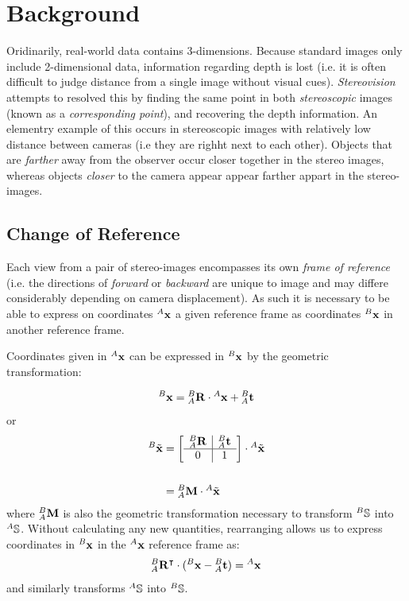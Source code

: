\chapter{Background}

\par Oridinarily, real-world data contains 3-dimensions. 
Because standard images only include 2-dimensional data, information regarding depth is lost (i.e. it is often difficult to judge distance from a single image without visual cues). 
\textit{Stereovision} attempts to resolved this by finding the same point in both \textit{stereoscopic} images (known as a \textit{corresponding point}), and recovering the depth information.
An elementry example of this occurs in stereoscopic images with relatively low distance between cameras (i.e they are righht next to each other). 
Objects that are \textit{farther} away from the observer occur closer together in the stereo images, whereas objects \textit{closer} to the camera appear appear farther appart in the stereo-images.

\section{Change of Reference}

\par Each view from a pair of stereo-images encompasses its own \textit{frame of reference} (i.e. the directions of \textit{forward} or \textit{backward} are unique to image and may differe considerably depending on camera displacement).
As such it is necessary to be able to express on coordinates ${^{A}\mathbf{x}}$ a given reference frame as coordinates ${^{B}\mathbf{x}}$ in another reference frame.

\par Coordinates given in ${^{A}\mathbf{x}}$ can be expressed in ${^{B}\mathbf{x}}$ by the geometric transformation:
\par
\begin{align*}
	{\ensuremath{^{B}}\mathbf{x}} = {^{B}_{A}}\mathbf{R} \cdot {\ensuremath{^{A}}\mathbf{x}} + {^{B}_{A}}\mathbf{t}
\end{align*}
or
\begin{align*}
	{\ensuremath{^{B}}\tilde{\mathbf{x}}} &=
	\left[\begin{array}{c|c}
		{\ensuremath{^{B}}\ensuremath{_{A}}}\textbf{R} & {^{B}_{A}}\textbf{t} \\\hline
		0 & 1 \\
	\end{array}\right]
	\cdot{\ensuremath{^{A}}\tilde{\mathbf{x}}} \\
	&\\
	&= {^{B}_{A}}\mathbf{M}\cdot{\ensuremath{^{A}}\tilde{\mathbf{x}}}\\
\end{align*}
where ${^{B}_{A}}\mathbf{M}$ is also the geometric transformation necessary to transform $^{B}\mathbb{S}$ into $^{A}\mathbb{S}$. Without calculating any new quantities, rearranging allows us to express coordinates in ${^{B}\mathbf{x}}$ in the ${^{A}\mathbf{x}}$ reference frame as:
\begin{equation*}
	{\ensuremath{{^{B}_{A}}\mathbf{R}}\ensuremath{^{\intercal}}}\cdot ({^{B}\mathbf{x}} - {^{B}_{A}}\mathbf{t} ) = {^{A}\mathbf{x}}
\end{equation*}
and similarly transforms $^{A}\mathbb{S}$ into $^{B}\mathbb{S}$.

